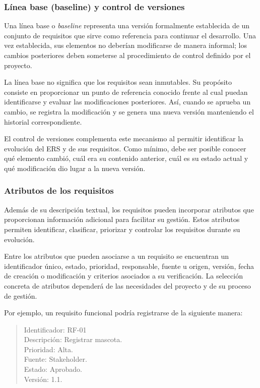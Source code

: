 \documentclass[journal,onecolumn]{IEEEtran}
\begin{document}
	\subsubsection{Línea base (baseline) y control de versiones}
	
	Una línea base o \textit{baseline} representa una versión formalmente establecida de un conjunto de requisitos que sirve como referencia para continuar el desarrollo. Una vez establecida, sus elementos no deberían modificarse de manera informal; los cambios posteriores deben someterse al procedimiento de control definido por el proyecto.
	
	La línea base no significa que los requisitos sean inmutables. Su propósito consiste en proporcionar un punto de referencia conocido frente al cual puedan identificarse y evaluar las modificaciones posteriores. Así, cuando se aprueba un cambio, se registra la modificación y se genera una nueva versión manteniendo el historial correspondiente.
	
	El control de versiones complementa este mecanismo al permitir identificar la evolución del ERS y de sus requisitos. Como mínimo, debe ser posible conocer qué elemento cambió, cuál era su contenido anterior, cuál es su estado actual y qué modificación dio lugar a la nueva versión.
	
	\subsubsection{Atributos de los requisitos}
	
	Además de su descripción textual, los requisitos pueden incorporar atributos que proporcionan información adicional para facilitar su gestión. Estos atributos permiten identificar, clasificar, priorizar y controlar los requisitos durante su evolución.
	
	Entre los atributos que pueden asociarse a un requisito se encuentran un identificador único, estado, prioridad, responsable, fuente u origen, versión, fecha de creación o modificación y criterios asociados a su verificación. La selección concreta de atributos dependerá de las necesidades del proyecto y de su proceso de gestión.
	
	Por ejemplo, un requisito funcional podría registrarse de la siguiente manera:
	
	\begin{quote}
		Identificador: RF-01\\
		Descripción: Registrar mascota.\\
		Prioridad: Alta.\\
		Fuente: Stakeholder.\\
		Estado: Aprobado.\\
		Versión: 1.1.
	\end{quote}
	
\end{document}
